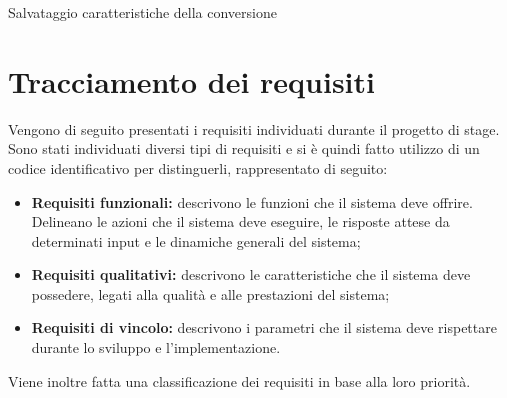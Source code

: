 \begin{usecase}{5}{Salvataggio caratteristiche della conversione}
    \label{uc:salvataggio-caratteristiche}
\end{usecase}
\clearpage

\section{Tracciamento dei requisiti}

Vengono di seguito presentati i requisiti individuati durante il progetto di
stage.\\
Sono stati individuati diversi tipi di requisiti e si è quindi fatto utilizzo di
un codice identificativo per distinguerli, rappresentato di seguito:
\begin{itemize}
    \item \textbf{Requisiti funzionali:} descrivono le funzioni che il sistema
          deve offrire. Delineano le azioni che il sistema deve eseguire, le
          risposte attese da determinati input e le dinamiche generali del sistema;
    \item \textbf{Requisiti qualitativi:} descrivono le caratteristiche che il
          sistema deve possedere, legati alla qualità e alle prestazioni del sistema;
    \item \textbf{Requisiti di vincolo:} descrivono i parametri che il sistema
          deve rispettare durante lo sviluppo e l'implementazione.
\end{itemize}
Viene inoltre fatta una classificazione dei requisiti in base alla loro
priorità.

